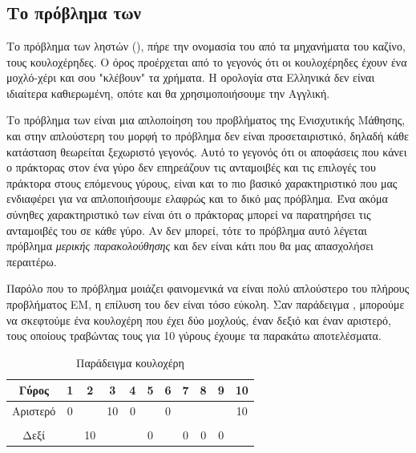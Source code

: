 \chapter{}
\section{Το πρόβλημα των }

Το πρόβλημα των ληστών (), πήρε την ονομασία του από τα μηχανήματα του καζίνο, τους κουλοχέρηδες. Ο όρος  προέρχεται από το γεγονός ότι οι κουλοχέρηδες έχουν ένα μοχλό-χέρι και σου "κλέβουν" τα χρήματα. Η ορολογία στα Ελληνικά δεν είναι ιδιαίτερα καθιερωμένη, οπότε και θα χρησιμοποιήσουμε την Αγγλική.

Το πρόβλημα των  είναι μια απλοποίηση του προβλήματος της Ενισχυτικής Μάθησης, και στην απλούστερη του μορφή το πρόβλημα δεν είναι προσεταιριστικό, δηλαδή κάθε κατάσταση θεωρείται ξεχωριστό γεγονός. Αυτό το γεγονός ότι οι αποφάσεις που κάνει ο πράκτορας στον ένα γύρο δεν επηρεάζουν τις ανταμοιβές και τις επιλογές του πράκτορα στους επόμενους γύρους, είναι και το πιο βασικό χαρακτηριστικό που μας ενδιαφέρει για να απλοποιήσουμε ελαφρώς και το δικό μας πρόβλημα. Ένα ακόμα σύνηθες χαρακτηριστικό των  είναι ότι ο πράκτορας μπορεί να παρατηρήσει τις ανταμοιβές του σε κάθε γύρο. Αν δεν μπορεί, τότε το πρόβλημα αυτό λέγεται πρόβλημα \textit{μερικής παρακολούθησης} και δεν είναι κάτι που θα μας απασχολήσει περαιτέρω.

Παρόλο που το πρόβλημα μοιάζει φαινομενικά να είναι πολύ απλούστερο του πλήρους προβλήματος ΕΜ, η επίλυση του δεν είναι τόσο εύκολη. Σαν παράδειγμα \cite{lattimore2020bandit}, μπορούμε να σκεφτούμε ένα κουλοχέρη που έχει δύο μοχλούς, έναν δεξιό και έναν αριστερό, τους οποίους τραβώντας τους για 10 γύρους έχουμε τα παρακάτω αποτελέσματα.

\begin{table}[ht]
    \centering
    \begin{tabularx}{\textwidth}{ccccccccccc}
        \hline
        Γύρος    & 1 & 2  & 3  & 4 & 5 & 6 & 7 & 8 & 9 & 10 \\
        \hline
        Αριστερό & 0 &    & 10 & 0 &   & 0 &   &   &   & 10 \\ \\
        Δεξί     &   & 10 &    &   & 0 &   & 0 & 0 & 0 &    \\
        \hline
    \end{tabularx}
    \caption{Παράδειγμα κουλοχέρη}
    \label{tab:bandit_example}
\end{table}

